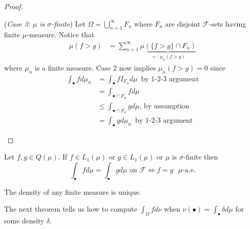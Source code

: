 \begin{proof}
\begin{flushleft}
\textbullet({\sl Case 3: $\mu$ is $\sigma$-finite})
Let $\Omega = \bigcup_{n=1}^\infty F_n$ where $F_n$ are disjoint $\mathcal F$-sets having finite $\mu$-measure. Notice that
\begin{align*}
\mu(f>g ) &= \sum_{n=1}^\infty \underbrace{\mu( \{f>g\} \cap F_n)}_{=:\mu_n (f>g)}
\end{align*}
where $\mu_n$ is a finite measure. Case 2 now implies $\mu_n(f>g ) = 0$ since
\begin{align*}
\int_\bullet f d\mu_n
&= \int_\bullet fI_{F_n} d\mu\,\text{ by 1-2-3 argument} \\
&= \int_{\bullet\cap F_n} f d\mu \\
&\leq \int_{\bullet\cap F_n} g d\mu,\,\text{by assumption} \\
&= \int_\bullet g d\mu_n \,\text{ by 1-2-3 argument}
\end{align*}
\end{flushleft}
\end{proof}


\begin{corollary}
\label{thm: uniqueness of densities}
  Let $f,g\in  Q(\mu)$. If $f\in  L_1(\mu)$ or $g\in  L_1(\mu)$ or  $\mu$ is $\sigma$-finite then
\[ \text{$\int_\bullet fd\mu= \int_\bullet gd\mu$ on $\mathcal F$} \Longleftrightarrow \text{$f= g$ $\mu$-a.e}. \]
\end{corollary}


\begin{corollary}
\label{thm: uniqueness of densities 2 }
The density of any finite measure is unique.
\end{corollary}

The next theorem tells us how to compute $\int_\Omega f d\nu$ when $\nu(\bullet) = \int_\bullet \delta d\mu$ for some density $\delta$.


